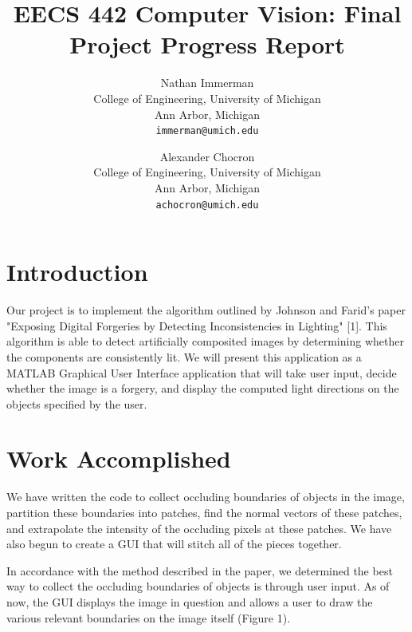 \documentclass[10pt,twocolumn,letterpaper]{article}
\begin{document}
\title{EECS 442 Computer Vision: Final Project Progress Report}

\author{Nathan Immerman\\
College of Engineering, University of Michigan\\
Ann Arbor, Michigan\\
{\tt\small immerman@umich.edu}
\and
Alexander Chocron\\
College of Engineering, University of Michigan\\
Ann Arbor, Michigan\\
{\tt\small achocron@umich.edu}
}

\maketitle

\section{Introduction}
Our project is to implement the algorithm outlined by Johnson and Farid's paper "Exposing Digital Forgeries by Detecting Inconsistencies in Lighting"  [1]. This algorithm is able to detect artificially composited images by determining whether the components are consistently lit. We will present this application as a MATLAB Graphical User Interface application that will take user input, decide whether the image is a forgery, and display the computed light directions on the objects specified by the user.

\section{Work Accomplished}
 We have written the code to collect occluding boundaries of objects in the image, partition these boundaries into patches,  find the normal vectors of these patches, and extrapolate the intensity of the occluding pixels at these patches. We have also begun to create a GUI that will stitch all of the pieces together. 

 In accordance with the method described in the paper, we determined the best way to collect the occluding boundaries of objects is through user input. As of now, the GUI displays the image in question and allows a user to draw the various relevant boundaries on the image itself (Figure 1). 
\end{document}
